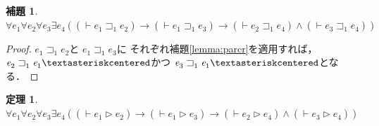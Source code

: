 \documentclass{ltjsbook}%
\newtheorem{theorem}{定理}[section]%
\newtheorem{lemma}{補題}[section]%
\newcommand\lemmaname{補題}%
\begin{document}
\begin{lemma}%
  $\forall\mathit{e}_1^{}\forall\mathit{e}_2^{}\forall\mathit{e}_3^{}\exists\mathit{e}_4^{}%
  ((\vdash\mathit{e}_1^{}\sqsupset_1^{}\mathit{e}_2^{})\rightarrow%
  (\vdash\mathit{e}_1^{}\sqsupset_1^{}\mathit{e}_3^{})\rightarrow%
  (\vdash\mathit{e}_2^{}\sqsupset_1^{}\mathit{e}_4^{})\land%
  (\vdash\mathit{e}_3^{}\sqsupset_1^{}\mathit{e}_4^{}))$%
\end{lemma}%
\begin{proof}%
  $\mathit{e}_1^{}\sqsupset_1^{}\mathit{e}_2^{}$と%
  $\mathit{e}_1^{}\sqsupset_1^{}\mathit{e}_3^{}$に%
  それぞれ\lemmaname\ref{lemma:parcr}を適用すれば，%
  $\mathit{e}_2^{}\sqsupset_1^{}\mathit{e}_1^{}\textasteriskcentered$かつ%
  $\mathit{e}_3^{}\sqsupset_1^{}\mathit{e}_1^{}\textasteriskcentered$となる．%
\end{proof}%
\begin{theorem}%
  $\forall\mathit{e}_1^{}\forall\mathit{e}_2^{}\forall\mathit{e}_3^{}\exists\mathit{e}_4^{}%
  ((\vdash\mathit{e}_1^{}\triangleright\mathit{e}_2^{})\rightarrow%
  (\vdash\mathit{e}_1^{}\triangleright\mathit{e}_3^{})\rightarrow%
  (\vdash\mathit{e}_2^{}\triangleright\mathit{e}_4^{})\land%
  (\vdash\mathit{e}_3^{}\triangleright\mathit{e}_4^{}))$%
\end{theorem}%
\backmatter%
\end{document}
